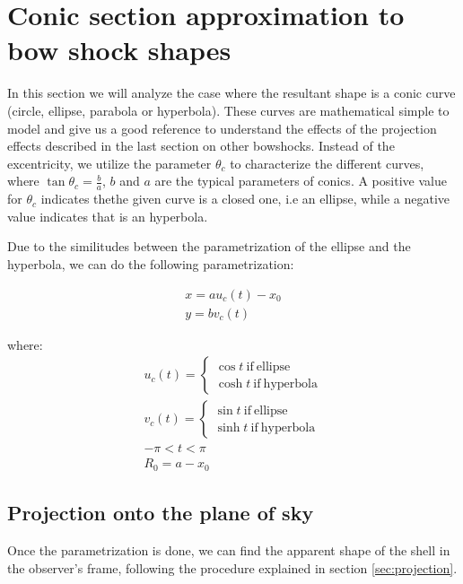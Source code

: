\section{Conic section approximation to bow shock shapes}
\label{sec:conic}


In this section we will analyze the case where the resultant shape is a conic curve (circle, ellipse, parabola or hyperbola).
These curves are mathematical simple to model and give us a good reference to understand the effects of the projection effects
described in the last section on other bowshocks. Instead of the excentricity, we utilize the parameter $\theta_c$ to characterize the different curves, where
$\tan\theta_c = \frac{b}{a}$,  $b$ and $a$ are the typical parameters of conics. A positive value for $\theta_c$ indicates thethe given curve is a closed one, i.e
an ellipse, while a negative value indicates that is an hyperbola. %

Due to the similitudes between the parametrization of the ellipse and the hyperbola, we can do the following parametrization:

\begin{align}
x = au_c(t)-x_0 \\ 
y = bv_c(t)
\end{align}

where:
\begin{align}
u_c(t) = \left\lbrace \begin{array}{c}
\cos t ~\mathrm{if~ellipse} \\
\cosh t ~\mathrm{if~hyperbola}
\end{array}\right.\\
v_c(t) = \left\lbrace \begin{array}{c}
\sin t ~\mathrm{if~ellipse} \\
\sinh t ~\mathrm{if~hyperbola}
\end{array}\right. \\
-\pi < t < \pi \\
R_0 = a - x_0 
\end{align}

\subsection{Projection onto the plane of sky} 

Once the parametrization is done, we can find the apparent shape of the shell in the observer's frame, following the procedure explained in section \ref{sec:projection}.

